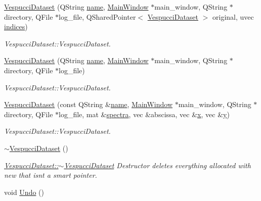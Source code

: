 \begin{DoxyCompactItemize}
\item 
\hyperlink{class_vespucci_dataset_a804af150636c59f3109a6a54267a861d}{Vespucci\+Dataset} (Q\+String \hyperlink{class_vespucci_dataset_a345a51b60127316b41caf92dc88fd792}{name}, \hyperlink{class_main_window}{Main\+Window} $\ast$main\+\_\+window, Q\+String $\ast$directory, Q\+File $\ast$log\+\_\+file, Q\+Shared\+Pointer$<$ \hyperlink{class_vespucci_dataset}{Vespucci\+Dataset} $>$ original, uvec \hyperlink{class_vespucci_dataset_ace7fb38d007d7fdd3c64be5174ae00f8}{indices})
\begin{DoxyCompactList}\small\item\em Vespucci\+Dataset\+::\+Vespucci\+Dataset. \end{DoxyCompactList}\item 
\hyperlink{class_vespucci_dataset_a15f16bb144fb3948e5277706d0959009}{Vespucci\+Dataset} (Q\+String \hyperlink{class_vespucci_dataset_a345a51b60127316b41caf92dc88fd792}{name}, \hyperlink{class_main_window}{Main\+Window} $\ast$main\+\_\+window, Q\+String $\ast$directory, Q\+File $\ast$log\+\_\+file)
\begin{DoxyCompactList}\small\item\em Vespucci\+Dataset\+::\+Vespucci\+Dataset. \end{DoxyCompactList}\item 
\hyperlink{class_vespucci_dataset_a277404f964a53639ac14c2c2d17859a9}{Vespucci\+Dataset} (const Q\+String \&\hyperlink{class_vespucci_dataset_a345a51b60127316b41caf92dc88fd792}{name}, \hyperlink{class_main_window}{Main\+Window} $\ast$main\+\_\+window, Q\+String $\ast$directory, Q\+File $\ast$log\+\_\+file, mat \&\hyperlink{class_vespucci_dataset_ac100f2f4f228ce57b3359a64ed585217}{spectra}, vec \&abscissa, vec \&\hyperlink{class_vespucci_dataset_add055b3b17436184f1712d8e28904250}{x}, vec \&\hyperlink{class_vespucci_dataset_a78181bbf489bf4e98fb4772ca6ae012e}{y})
\begin{DoxyCompactList}\small\item\em Vespucci\+Dataset\+::\+Vespucci\+Dataset. \end{DoxyCompactList}\item 
\hyperlink{class_vespucci_dataset_aa9d0b0fd3cff79098cf16d44a94c6204}{$\sim$\+Vespucci\+Dataset} ()\hypertarget{class_vespucci_dataset_aa9d0b0fd3cff79098cf16d44a94c6204}{}\label{class_vespucci_dataset_aa9d0b0fd3cff79098cf16d44a94c6204}

\begin{DoxyCompactList}\small\item\em \hyperlink{class_vespucci_dataset_aa9d0b0fd3cff79098cf16d44a94c6204}{Vespucci\+Dataset\+::$\sim$\+Vespucci\+Dataset} Destructor deletes everything allocated with new that isn\textquotesingle{}t a smart pointer. \end{DoxyCompactList}\item 
void \hyperlink{class_vespucci_dataset_aff9e3befb759a5a8f54a703434203fb1}{Undo} ()\hypertarget{class_vespucci_dataset_aff9e3befb759a5a8f54a703434203fb1}{}\label{class_vespucci_dataset_aff9e3befb759a5a8f54a703434203fb1}


\end{DoxyCompactItemize}

